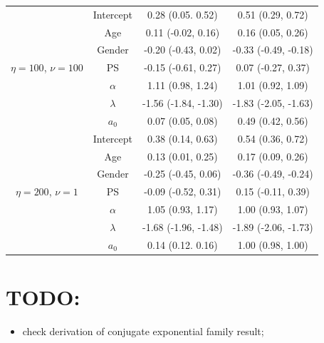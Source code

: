 \documentclass[a4paper, notitlepage, 11pt]{article}
\begin{document}
\begin{table}[!ht]
\begin{tabular}{cccc}
\multirow{7}{*}{$\eta = 100$, $\nu  = 100$} & Intercept & 0.28 (0.05. 0.52)    & 0.51 (0.29, 0.72)           \\
                                            & Age       & 0.11 (-0.02, 0.16)   & 0.16 (0.05, 0.26)           \\
                                            & Gender    & -0.20 (-0.43, 0.02)  & -0.33 (-0.49, -0.18)        \\
                                            & PS        & -0.15 (-0.61, 0.27)  & 0.07 (-0.27, 0.37)          \\
                                            & $\alpha$  & 1.11 (0.98, 1.24)    & 1.01 (0.92, 1.09)           \\
                                            & $\lambda$ & -1.56 (-1.84, -1.30) & -1.83 (-2.05, -1.63)        \\
                                            & $a_0$     & 0.07 (0.05, 0.08)    & 0.49 (0.42, 0.56)           \\
\multirow{7}{*}{$\eta = 200$, $\nu  = 1$}   & Intercept & 0.38 (0.14, 0.63)    & 0.54 (0.36, 0.72)           \\
                                            & Age       & 0.13 (0.01, 0.25)    & 0.17 (0.09, 0.26)           \\
                                            & Gender    & -0.25 (-0.45, 0.06)  & -0.36 (-0.49, -0.24)        \\
                                            & PS        & -0.09 (-0.52, 0.31)  & 0.15 (-0.11, 0.39)          \\
                                            & $\alpha$  & 1.05 (0.93, 1.17)    & 1.00 (0.93, 1.07)           \\
                                            & $\lambda$ & -1.68 (-1.96, -1.48) & -1.89 (-2.06, -1.73)        \\
                                            & $a_0$     & 0.14 (0.12. 0.16)    & 1.00 (0.98, 1.00)           \\ \cline{2-4} 
\end{tabular}
\end{table}

\section*{TODO:}
\begin{itemize}
  \item check derivation of conjugate exponential family result;
\end{itemize}
\end{document}
